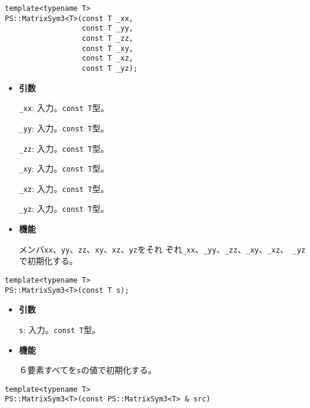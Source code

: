 \begin{screen}
\begin{verbatim}
template<typename T>
PS::MatrixSym3<T>(const T _xx,
                  const T _yy,
                  const T _zz,
                  const T _xy,
                  const T _xz,
                  const T _yz);
\end{verbatim}
\end{screen}

\begin{itemize}

\item{{\bf 引数}}

{\tt \_xx}: 入力。{\tt const T}型。

{\tt \_yy}: 入力。{\tt const T}型。

{\tt \_zz}: 入力。{\tt const T}型。

{\tt \_xy}: 入力。{\tt const T}型。

{\tt \_xz}: 入力。{\tt const T}型。

{\tt \_yz}: 入力。{\tt const T}型。

\item{{\bf 機能}}

メンバ{\tt xx}、{\tt yy}、{\tt zz}、{\tt xy}、{\tt xz}、{\tt yz}をそれ
ぞれ{\tt \_xx}、{\tt \_yy}、{\tt \_zz}、{\tt \_xy}、{\tt \_xz}、{\tt
  \_yz}で初期化する。

\end{itemize}

\begin{screen}
\begin{verbatim}
template<typename T>
PS::MatrixSym3<T>(const T s);
\end{verbatim}
\end{screen}

\begin{itemize}

\item{{\bf 引数}}

{\tt s}: 入力。{\tt const T}型。

\item{{\bf 機能}}

６要素すべてを{\tt s}の値で初期化する。

\end{itemize}

\begin{screen}
\begin{verbatim}
template<typename T>
PS::MatrixSym3<T>(const PS::MatrixSym3<T> & src)
\end{verbatim}
\end{screen}

